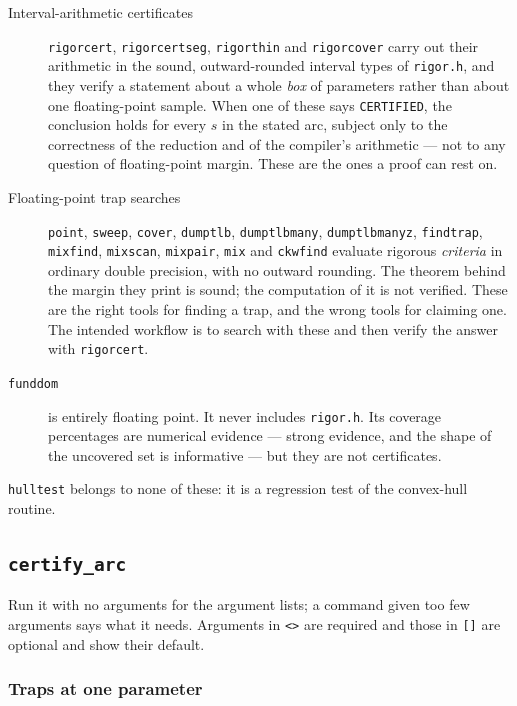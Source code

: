 \documentclass{amsart}
\begin{document}
\begin{description}
\item[Interval-arithmetic certificates] \texttt{rigorcert}, \texttt{rigorcertseg},
\texttt{rigorthin} and \texttt{rigorcover} carry out their arithmetic in the sound, outward-rounded
interval types of \texttt{rigor.h}, and they verify a statement about a whole \emph{box} of
parameters rather than about one floating-point sample.  When one of these says
\texttt{CERTIFIED}, the conclusion holds for every $s$ in the stated arc, subject only to the
correctness of the reduction and of the compiler's arithmetic --- not to any question of
floating-point margin.  These are the ones a proof can rest on.
\item[Floating-point trap searches] \texttt{point}, \texttt{sweep}, \texttt{cover},
\texttt{dumptlb}, \texttt{dumptlbmany}, \texttt{dumptlbmanyz}, \texttt{findtrap},
\texttt{mixfind}, \texttt{mixscan}, \texttt{mixpair}, \texttt{mix} and \texttt{ckwfind} evaluate
rigorous \emph{criteria} in ordinary double precision, with no outward rounding.  The theorem
behind the margin they print is sound; the computation of it is not verified.  These are the
right tools for finding a trap, and the wrong tools for claiming one.  The intended workflow is
to search with these and then verify the answer with \texttt{rigorcert}.
\item[\texttt{funddom}] is entirely floating point.  It never includes \texttt{rigor.h}.  Its
coverage percentages are numerical evidence --- strong evidence, and the shape of the uncovered
set is informative --- but they are not certificates.
\end{description}

\texttt{hulltest} belongs to none of these: it is a regression test of the convex-hull routine.

\subsection{\texttt{certify\_arc}}

Run it with no arguments for the argument lists; a command given too few arguments says what it
needs.  Arguments in \verb|<>| are required and those in \verb|[]| are optional and show their
default.

\subsubsection{Traps at one parameter}
\end{document}

